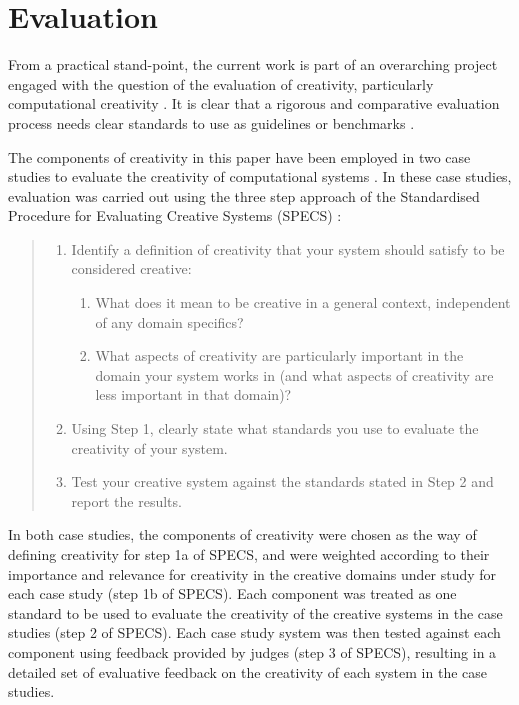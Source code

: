 \documentclass[10pt,letterpaper]{article}
\begin{document}
\section*{Evaluation}

From a practical stand-point, the current work is part of an overarching project engaged with the question of the evaluation of creativity, particularly computational creativity \cite{jordanous12cc}. It is clear that a rigorous and comparative evaluation process needs clear standards to use as guidelines or benchmarks \cite{torrance88,kaufman09}.  

The components of creativity in this paper have been employed in two case studies to evaluate the creativity of computational systems \cite{jordanousphd,jordanous12jims,jordanous16aisb}. In these case studies, evaluation was carried out using the three step approach of the Standardised Procedure for Evaluating Creative Systems (SPECS) \cite{jordanous12cc}:

\begin{quote}
\begin{enumerate}
\item Identify a definition of creativity that your system should satisfy to be considered creative:
	\begin{enumerate}
	\item What does it mean to be creative in a general context, independent of any domain specifics?
	\item What aspects of creativity are particularly important in the domain your system works in (and what aspects of creativity are less important in that domain)?
	\end{enumerate}
\item Using Step 1, clearly state what standards you use to evaluate the creativity of your system.
\item Test your creative system against the standards stated in Step 2 and report the results.
\end{enumerate}    
\end{quote}

In both case studies, the components of creativity were chosen as the way of defining creativity for step 1a of SPECS, and were weighted according to their importance and relevance for creativity in the creative domains under study for each case study (step 1b of SPECS). Each component was treated as one standard to be used to evaluate the creativity of the creative systems in the case studies (step 2 of SPECS). Each case study system was then tested against each component using feedback provided by judges (step 3 of SPECS), resulting in a detailed set of evaluative feedback on the creativity of each system in the case studies.
\end{document}
